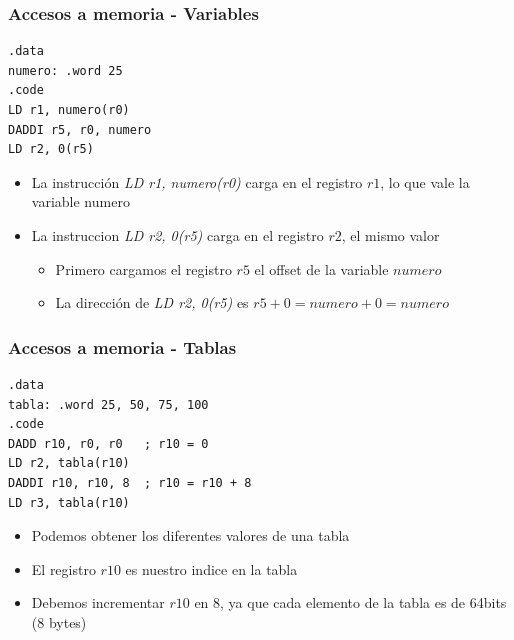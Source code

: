 \documentclass{beamer}
\begin{document}
\begin{frame}[fragile]
\frametitle{Accesos a memoria - Variables}
\begin{block}{}
\begin{lstlisting}[language=WinMIPS64,basicstyle=\ttfamily,keywordstyle=\color{blue}]
.data
numero: .word 25
.code
LD r1, numero(r0)
DADDI r5, r0, numero
LD r2, 0(r5)
\end{lstlisting}
\end{block}
\begin{itemize}
\item La instrucción \emph{LD r1, numero(r0)} carga en el registro $r1$, lo que vale la variable numero
\item La instruccion \emph{LD r2, 0(r5)} carga en el registro $r2$, el mismo valor
\begin{itemize}
\item Primero cargamos el registro $r5$ el offset de la variable $numero$
\item La dirección de \emph{LD r2, 0(r5)} es $r5 + 0 = numero + 0 = numero$
\end{itemize}
\end{itemize}
\end{frame}

\begin{frame}[fragile]
\frametitle{Accesos a memoria - Tablas}
\begin{block}{}
\begin{lstlisting}[language=WinMIPS64,basicstyle=\ttfamily,keywordstyle=\color{blue}]
.data
tabla: .word 25, 50, 75, 100
.code
DADD r10, r0, r0   ; r10 = 0
LD r2, tabla(r10)
DADDI r10, r10, 8  ; r10 = r10 + 8
LD r3, tabla(r10)
\end{lstlisting}
\end{block}
\begin{itemize}
\item Podemos obtener los diferentes valores de una tabla
\item El registro $r10$ es nuestro indice en la tabla
\item Debemos incrementar $r10$ en 8, ya que cada elemento de la tabla es de 64bits (8 bytes)
\end{itemize}
\end{frame}
\end{document}
